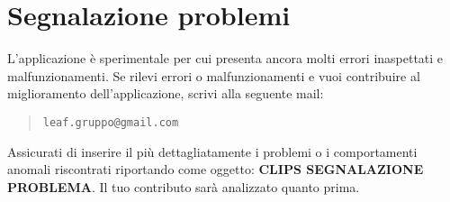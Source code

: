 \documentclass[../ClipsManualeUtente.tex]{subfiles}
\begin{document}
\section{Segnalazione problemi}
	L'applicazione è sperimentale per cui presenta ancora molti errori inaspettati e malfunzionamenti. Se rilevi errori o malfunzionamenti e vuoi contribuire al miglioramento dell'applicazione, scrivi alla seguente mail:
	\begin{quote}
		\centering
		\verb|leaf.gruppo@gmail.com|
	\end{quote}
	Assicurati di inserire il più dettagliatamente i problemi o i comportamenti anomali riscontrati riportando come oggetto: \textbf{CLIPS SEGNALAZIONE PROBLEMA}.
	Il tuo contributo sarà analizzato quanto prima.
\end{document}
